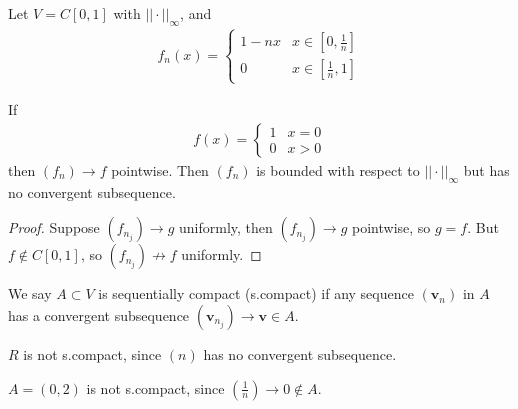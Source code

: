\documentclass[a4paper]{article}
\begin{document}
\begin{eg}
Let $V=C\left[0,1\right]$ with $||\cdot||_\infty$, and
\begin{equation*}
\begin{aligned}
f_n\left(x\right) = \left\{ \begin{array}{ll}
1-nx & x \in \left[0,\frac{1}{n}\right]\\
0 & x\in\left[\frac{1}{n},1\right]
\end{array}
\right.
\end{aligned}
\end{equation*}


If
\begin{equation*}
\begin{aligned}
f\left(x\right) = \left\{\begin{array}{ll}
1 & x=0\\
0 & x>0
\end{array}
\right.
\end{aligned}
\end{equation*}
then $\left(f_n\right) \to f$ pointwise. Then $\left(f_n\right)$ is bounded with respect to $||\cdot||_\infty$ but has no convergent subsequence.
\begin{proof}
Suppose $\left(f_{n_j}\right) \to g$ uniformly, then $\left(f_{n_j}\right) \to g$ pointwise, so $g=f$. But $f \not\in C\left[0,1\right]$, so $\left(f_{n_j}\right) \not\to f$ uniformly.
\end{proof}
\end{eg}

\begin{defi}
We say $A \subset V$ is sequentially compact (s.compact) if any sequence $\left(\mathbf{v}_n\right)$ in $A$ has a convergent subsequence $\left(\mathbf{v}_{n_j}\right) \to \mathbf{v} \in A$.
\end{defi}

\begin{eg}
$R$ is not s.compact, since $\left(n\right)$ has no convergent subsequence.
\end{eg}

\begin{eg}
$A=\left(0,2\right)$ is not s.compact, since $\left(\frac{1}{n}\right) \to 0 \not\in A$.
\end{eg}
\end{document}

